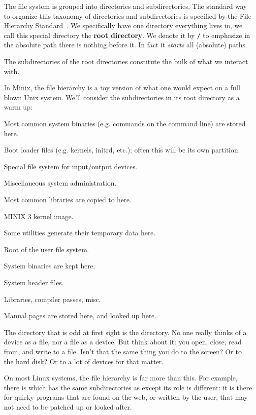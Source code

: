 
The file system is grouped into directories and
subdirectories. The standard way to organize this taxonomy of
directories and subdirectories is specified by the File Hierarchy
Standard~\cite{fhs}. We specifically have one directory
everything lives in, we call this special directory the
\textbf{root directory}. We denote it by \texttt{/} to emphasize
in the absolute path there is nothing before it. In fact it
\emph{starts} all (absolute) paths.

The subdirectories of the root directories constitute the bulk of
what we interact with.

In Minix, the file hierarchy is a toy version of what one would
expect on a full blown Unix system. We'll consider the
subdirectories in its root directory as a warm up:
\begin{list}{\quad}{}
\item[\courier{/bin/}] Most common system binaries (e.g. commands on the
  command line) are stored here.
\item[\courier{/boot}] Boot loader files (e.g. kernels, initrd,
  etc.); often this will be its own partition.
\item[\courier{/dev/}] Special file system for input/output devices.
\item[\courier{/etc/}] Miscellaneous system administration.
\item[\courier{/lib/}] Most common libraries are copied to here.
\item[\courier{/minix}] MINIX 3 kernel image.
\item[\courier{/tmp/}] Some utilities generate their temporary data here.
\item[\courier{/usr/}] Root of the user file system.
\item[\courier{/usr/bin}] System binaries are kept here.
\item[\courier{/usr/include}] System header files.
\item[\courier{/usr/lib}] Libraries, compiler passes, misc.
\item[\courier{/usr/man}] Manual pages are stored here, and looked up here.
\end{list}
The directory that is odd at first sight is the 
directory. No one really thinks of a device as a file, nor a file
as a device. But think about it: you open, close, read from, and
write to a file. Isn't that the same thing you do to the screen?
Or to the hard disk? Or to a lot of devices for that matter.

On most Linux systems, the file hierarchy is far more than
this. For example, there is  which has the
same subdirectories as  except its role is
different: it is there for quirky programs that are found on the
web, or written by the user, that may not need to be patched up
or looked after.
